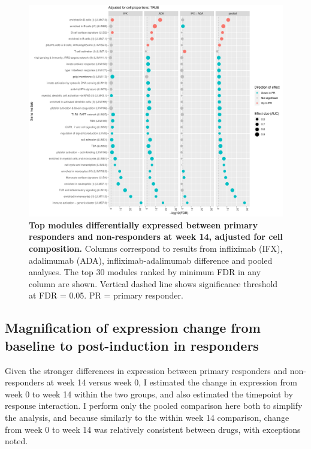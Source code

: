 \begin{figure}
    \centering
    \includegraphics[width=1.0\textwidth,page=1]{mainmatter/figures/chapter_04/plot_gene_set_enrichment.tmodCERNO_panelplot_reversed_C_3RI_3NI,C_3RA_3NA,C_(3RI_3NI)_(3RA_3NA),C_3R_3N.cell_prop_correction_TRUE.pdf}
    \caption{
        \textbf{Top modules differentially expressed between primary responders and non-responders at week 14, adjusted for cell composition.}
        Columns correspond to results from infliximab (IFX), adalimumab (ADA), infliximab-adalimumab difference and pooled analyses. 
        The top 30 modules ranked by minimum \gls{FDR} in any column are shown. Vertical dashed line shows significance threshold at FDR = 0.05.
        PR = primary responder.
    }
    \label{fig:multipants_dge_panelPlot_week_14_R_N_cellPropT}
\end{figure}

\subsection{Magnification of expression change from baseline to post-induction in responders}

Given the stronger differences in expression between primary responders and non-responders at week 14 versus week 0,
I estimated the change in expression from week 0 to week 14 within the two groups, and also estimated the timepoint by response interaction.
I perform only the pooled comparison here both to simplify the analysis, and because similarly to the within week 14 comparison, change from week 0 to week 14 was relatively consistent between drugs, with exceptions noted.

